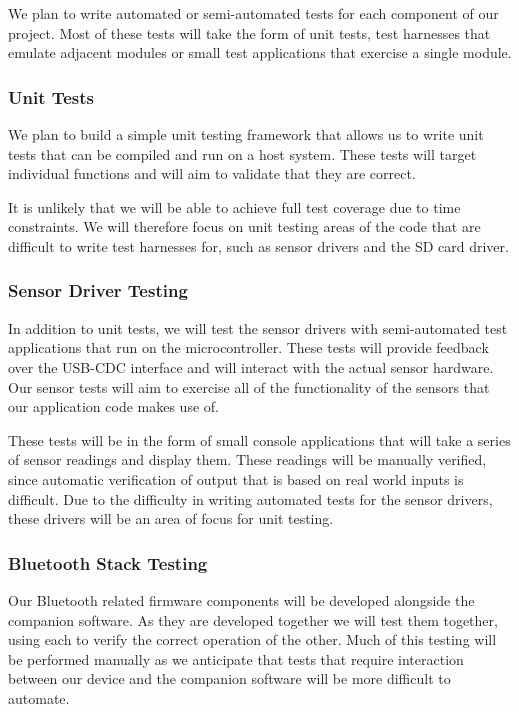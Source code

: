 \iffalse

We plan to write automated or semi-automated tests for each component of our
project. Most of these tests will take the form of unit tests, test harnesses
that emulate adjacent modules or small test applications that exercise a single
module.

\subsubsection{Unit Tests}

We plan to build a simple unit testing framework that allows us to write unit
tests that can be compiled and run on a host system. These tests will target
individual functions and will aim to validate that they are correct.

It is unlikely that we will be able to achieve full test coverage due to time
constraints. We will therefore focus on unit testing areas of the code that
are difficult to write test harnesses for, such as sensor drivers and the SD
card driver.

\subsubsection{Sensor Driver Testing}

In addition to unit tests, we will test the sensor drivers with semi-automated
test applications that run on the microcontroller. These tests will provide
feedback over the USB-CDC interface and will interact with the actual sensor
hardware.  Our sensor tests will aim to exercise all of the functionality of the
sensors that our application code makes use of.

These tests will be in the form of small console applications that will take
a series of sensor readings and display them. These readings will be manually
verified, since automatic verification of output that is based on real world
inputs is difficult. Due to the difficulty in writing automated tests for the
sensor drivers, these drivers will be an area of focus for unit testing.

\subsubsection{Bluetooth Stack Testing}

Our Bluetooth related firmware components will be developed alongside the
companion software. As they are developed together we will test them together,
using each to verify the correct operation of the other. Much of this testing
will be performed manually as we anticipate that tests that require interaction
between our device and the companion software will be more difficult to
automate.

